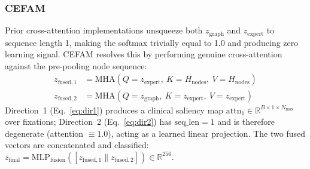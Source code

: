 \subsubsection{CEFAM}
Prior cross-attention implementations unsqueeze both $z_\text{graph}$ and $z_\text{expert}$ to sequence length 1, making the softmax trivially equal to 1.0 and producing zero learning signal. CEFAM resolves this by performing genuine cross-attention against the pre-pooling node sequence:
\begin{align}
    z_{\text{fused},1} &= \text{MHA}(Q{=}z_\text{expert},\ K{=}H_\text{nodes},\ V{=}H_\text{nodes}) \label{eq:dir1}\\
    z_{\text{fused},2} &= \text{MHA}(Q{=}z_\text{graph},\ K{=}z_\text{expert},\ V{=}z_\text{expert}) \label{eq:dir2}
\end{align}
Direction~1 (Eq.~\ref{eq:dir1}) produces a clinical saliency map $\text{attn}_1 \in \mathbb{R}^{B \times 1 \times N_\text{max}}$ over fixations; Direction~2 (Eq.~\ref{eq:dir2}) has $\text{seq\_len}{=}1$ and is therefore degenerate (attention ${\equiv}1.0$), acting as a learned linear projection. The two fused vectors are concatenated and classified: $z_\text{final} = \text{MLP}_\text{fusion}([z_{\text{fused},1} \| z_{\text{fused},2}]) \in \mathbb{R}^{256}$.
 
